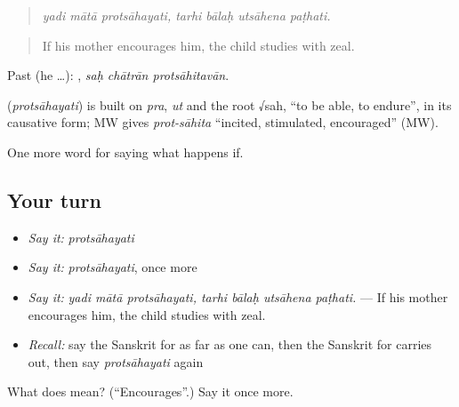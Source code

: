 \begin{quote}
\emph{yadi mātā protsāhayati, tarhi bālaḥ utsāhena paṭhati.}
\end{quote}

\begin{quote}
If his mother encourages him, the child studies with zeal.
\end{quote}

Past (he …):   , \emph{saḥ chātrān protsāhitavān}.

\begin{cousinweb}
\textbf{} (\emph{protsāhayati}) is built on \emph{pra}, \emph{ut} and the root √sah, \textquotedblleft{}to be able, to endure\textquotedblright{}, in its causative form; MW gives \emph{prot-sāhita} \textquotedblleft{}incited, stimulated, encouraged\textquotedblright{} (MW).
\end{cousinweb}

\begin{grammarlens}[title={What you've built}]
One more word for saying what happens if.
\end{grammarlens}

\subsection*{Your turn}
\begin{itemize}
\raggedright
  \item \emph{Say it:} \emph{protsāhayati}
  \item \emph{Say it:} \emph{protsāhayati}, once more
  \item \emph{Say it:} \emph{yadi mātā protsāhayati, tarhi bālaḥ utsāhena paṭhati.} — If his mother encourages him, the child studies with zeal.
  \item \emph{Recall:} say the Sanskrit for as far as one can, then the Sanskrit for carries out, then say \emph{protsāhayati} again
\end{itemize}

\begin{tcolorbox}[breakable,colback=teal!4,colframe=teal!35!black,title={Before you move on}]
What does  mean? (\textquotedblleft{}Encourages\textquotedblright{}.) Say it once more.
\end{tcolorbox}
